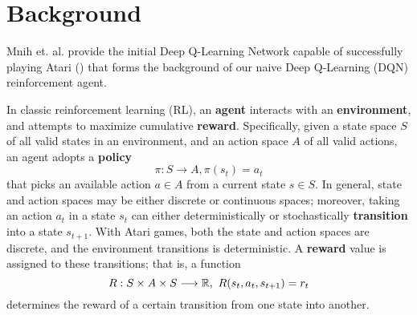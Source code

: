 \documentclass{article} %
\begin{document}
\section{Background}

Mnih et. al. provide the initial Deep Q-Learning Network capable of successfully playing Atari
(\cite{Mnih}) that forms the background of our naive Deep Q-Learning (DQN) reinforcement agent.

In classic reinforcement learning (RL), an \textbf{agent} interacts with an \textbf{environment},
and attempts to maximize cumulative \textbf{reward}. Specifically, given a state space $S$ of all
valid states in an environment, and an action space $A$ of all valid actions, an agent adopts a
\textbf{policy} \[
  \pi: S\longrightarrow A, \pi(s_t)=a_t
\] that picks an available action $a\in A$ from a current state $s \in S$. In general, state and
action spaces may be either discrete or continuous spaces; moreover, taking an action $a_t$ in a
state $s_t$ can either deterministically or stochastically \textbf{transition} into a state
$s_{t+1}$. With Atari games, both the state and action spaces are discrete, and the environment
transitions is deterministic. A \textbf{reward} value is assigned to these transitions; that is, a
function \[
  R: S\times A\times S\longrightarrow \mathbb{R},\ R(s_t, a_t, s_{t+1})=r_t
\] determines the reward of a certain transition from one state into another.
\end{document}
